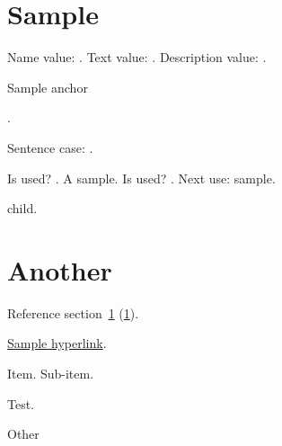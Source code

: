 \documentclass{article}
\begin{document}
\tableofcontents

\section{Sample}
\label{sec:sample}
Name value: .
Text value: .
Description value: .

\hypertarget{sampleanchor}{Sample anchor}.

Sentence case: .

Is used? .
A \gls{sample}.
Is used? .
Next use: \gls{sample}.

\Gls{child}.

\section{Another}
\label{sec:another}

Reference section~\ref{sec:sample} (\ref*{sec:sample}).

\hyperlink{sampleanchor}{Sample hyperlink}.

%

\begin{theglossary}
\item Item.
\glstreesubitem Sub-item.
\end{theglossary}
Test.

Other
\end{document}
